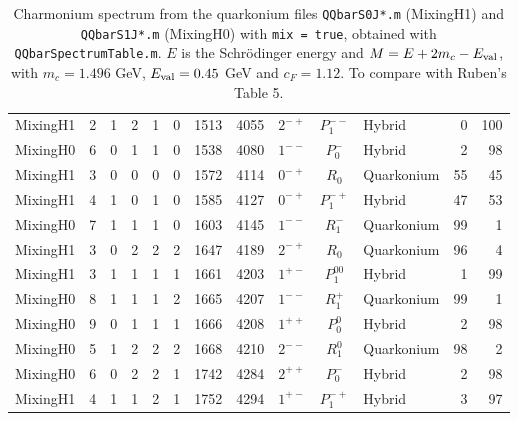 \documentclass[11pt, a4paper]{article}
\begin{document}
\begin{table}[p]
\begin{tabular}{l r r r r r r r c c l r r}
\rowcolor{red!12} MixingH1 & 2 & 1 & 2 & 1 & 0 & 1513 & 4055 & $2^{-+}$ & $P_1^{--}$ & Hybrid & 0 & 100 \\
\rowcolor{red!12} MixingH0 & 6 & 0 & 1 & 1 & 0 & 1538 & 4080 & $1^{--}$ & $P_0^{-}$ & Hybrid & 2 & 98 \\
\rowcolor{cyan!12} MixingH1 & 3 & 0 & 0 & 0 & 0 & 1572 & 4114 & $0^{-+}$ & $R_0$ & Quarkonium & 55 & 45 \\
\rowcolor{red!12} MixingH1 & 4 & 1 & 0 & 1 & 0 & 1585 & 4127 & $0^{-+}$ & $P_1^{-+}$ & Hybrid & 47 & 53 \\
\rowcolor{cyan!12} MixingH0 & 7 & 1 & 1 & 1 & 0 & 1603 & 4145 & $1^{--}$ & $R_1^{-}$ & Quarkonium & 99 & 1 \\
\rowcolor{cyan!12} MixingH1 & 3 & 0 & 2 & 2 & 2 & 1647 & 4189 & $2^{-+}$ & $R_0$ & Quarkonium & 96 & 4 \\
\rowcolor{red!12} MixingH1 & 3 & 1 & 1 & 1 & 1 & 1661 & 4203 & $1^{+-}$ & $P_1^{00}$ & Hybrid & 1 & 99 \\
\rowcolor{cyan!12} MixingH0 & 8 & 1 & 1 & 1 & 2 & 1665 & 4207 & $1^{--}$ & $R_1^{+}$ & Quarkonium & 99 & 1 \\
\rowcolor{red!12} MixingH0 & 9 & 0 & 1 & 1 & 1 & 1666 & 4208 & $1^{++}$ & $P_0^{0}$ & Hybrid & 2 & 98 \\
\rowcolor{cyan!12} MixingH0 & 5 & 1 & 2 & 2 & 2 & 1668 & 4210 & $2^{--}$ & $R_1^{0}$ & Quarkonium & 98 & 2 \\
\rowcolor{red!12} MixingH0 & 6 & 0 & 2 & 2 & 1 & 1742 & 4284 & $2^{++}$ & $P_0^{-}$ & Hybrid & 2 & 98 \\
\rowcolor{red!12} MixingH1 & 4 & 1 & 1 & 2 & 1 & 1752 & 4294 & $1^{+-}$ & $P_1^{-+}$ & Hybrid & 3 & 97 \\
\bottomrule
\end{tabular}
\caption{\small Charmonium spectrum from the quarkonium files \texttt{QQbarS0J*.m} (MixingH1) and \texttt{QQbarS1J*.m} (MixingH0) with \texttt{mix = true}, obtained with \texttt{QQbarSpectrumTable.m}. $E$ is the Schrödinger energy and $M=E+2m_c-E_{\rm val}$, with $m_c=1.496$ GeV, $E_{\rm val}=0.45$ GeV and $c_F=1.12$. To compare with Ruben's Table 5.}
\label{tab:specQ}
\end{table}
\end{document}
